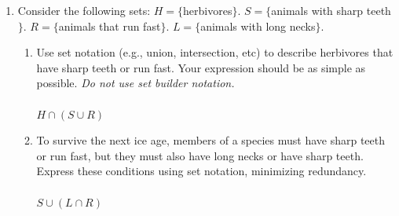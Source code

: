 \documentclass[12pt]{article}
\begin{document}
\begin{enumerate}
\begin{enumerate}
\item Let $A = \{100, 200, 4, 2, -8\}$.   Let $B= \{0, 4, -8, 100, 200\}$.  \\
What is $(A-B) - (B-A)$? \\\\
{\color{blue}
$
(A-B)=\{2\}\\
(B-A)=\{0\}\\
\{2\}-\{0\} = \boxed{\{2\}}
$
  }

\item Let $A = \{100, 200, 4, 2, -8\}$.   Let $B= \{0, 4, -8, 100, 200\}$\\
What is  $A - (A - B)$? \\\\

{\color{blue}
$
(A-B)=\{2\}\\
A-\{2\}=\boxed{ \{ 100,200,4,-8 \} }
$
}
\item
Use set builder notation to express $\{3,7,11,15,\ldots , 403\}$, as compactly as possible, with as little English as possible. \\
{\color{blue}
  Assuming $0\in {\Bbb N}$ \\
$
\boxed{\{x\in {\Bbb N}|3+4x\leqslant 403\}}
$
}

\end{enumerate}



\newpage




\item 
Consider the following sets: 
$H = \{$herbivores$\}$.           			
$S=\{$animals with sharp teeth$\}$.      	
$R = \{$animals that run fast$\}$.              
$L=\{$animals with long necks$\}$.             

\begin{enumerate}


\item
Use set notation (e.g., union, intersection, etc) to describe herbivores that have sharp teeth or run fast.  
Your expression should be as simple as possible. 
{\em  Do not use set  builder notation.}\\\\
{\color{blue}
  $
  \boxed{H\cap (S \cup R)}
  $
}


\item
To survive the next ice age, members of a species must have sharp teeth  or   run fast,  but they  must   also have long necks  or have sharp teeth.
Express these conditions using set notation, minimizing redundancy. \\\\
{\color{blue}
$
\boxed{S\cup (L \cap R)}
$
}



\end{enumerate}
\end{enumerate}
\end{document}

